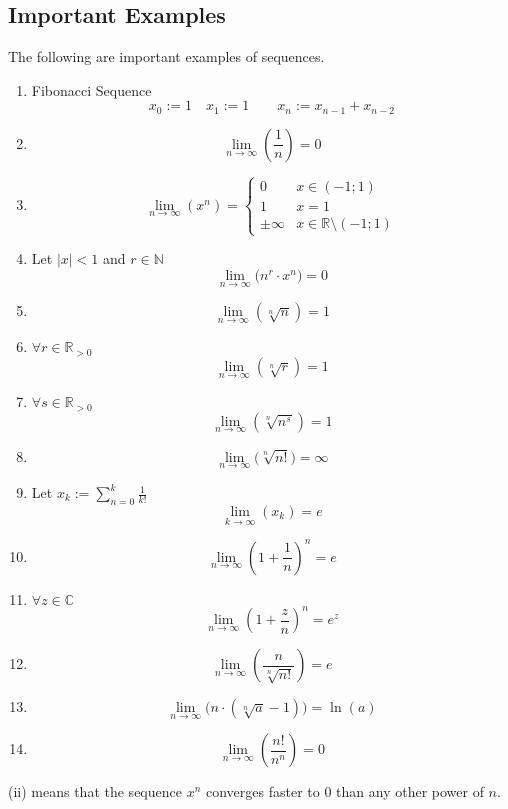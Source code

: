 \subsection{Important Examples}
\begin{proposition}
   The following are important examples of sequences.

   \begin{enumerate}[label=\roman*, align=Center]
      \item Fibonacci Sequence
         \[x_0 := 1 \quad x_1 := 1 \qquad x_{n} := x_{n-1} + x_{n-2}\]
      \item \[\lim_{n \to \infty} \left(\frac{1}{n}\right) = 0\]
      \item \[\lim_{n \to \infty}(x^n) = \begin{cases}
               0 & x \in (-1; 1)\\
               1 & x = 1\\
               \pm\infty & x \in \mathbb{R}\setminus (-1;1)
         \end{cases}\]
      \item Let \(|x| < 1\) and \(r \in \mathbb{N}\)
         \[\lim_{n \to \infty}\big(n^r \cdot x^n\big) = 0\]
      \item \[\lim_{n \to \infty}(\sqrt[n]{n}) = 1\]
      \item \(\forall r \in \mathbb{R}_{>0}\)
         \[\lim_{n \to \infty}(\sqrt[n]{r}) = 1\]
      \item \(\forall s \in \mathbb{R}_{>0}\)
         \[\lim_{n \to \infty}(\sqrt[n]{n^s}) = 1\]
      \item \[\lim_{n \to \infty}\big(\sqrt[n]{n!}\big) = \infty\]
      \item Let \(x_k := \sum_{n=0}^k \frac{1}{k!}\)
         \[\lim_{k \to \infty}(x_k) = e\]
      \item \[\lim_{n \to \infty}\left(1 + \frac{1}{n}\right)^n = e\]
      \item \(\forall z \in \mathbb{C}\)
         \[\lim_{n \to \infty}\left(1 + \frac{z}{n}\right)^n = e^z\]
      \item \[\lim_{n \to \infty}\left(\frac{n}{\sqrt[n]{n!}}\right) = e\]
      \item \[\lim_{n \to \infty}\big(n \cdot (\sqrt[n]{a} - 1)\big) = \ln(a)\]
      \item
         \[\lim_{n \to \infty}\left(\frac{n!}{n^n}\right) = 0\]
   \end{enumerate}
\end{proposition}
\begin{remark}
   (ii) means that the sequence \(x^n\) converges faster to 0 than any other power of \(n\).
\end{remark}
